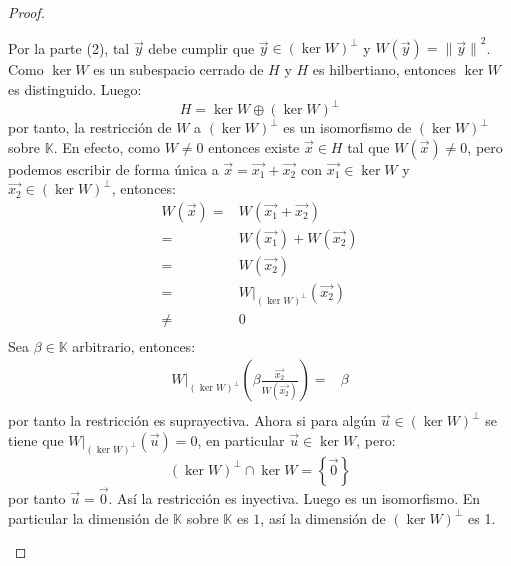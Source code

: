 \documentclass[12pt]{report}
\theoremstyle{largebreak}
\newcommand\norm[1]{\ensuremath{\|#1\|}}
\begin{document}
\begin{proof}
\begin{enumerate}
            Por la parte (2), tal $\vec{y}$ debe cumplir que $\vec{y}\in \left(\ker W\right)^\perp$ y $W(\vec{y})=\norm{\vec{y}}^2$. Como $\ker W $ es un subespacio cerrado de $H$ y $H$ es hilbertiano, entonces $\ker W$ es distinguido. Luego:
            \begin{equation*}
                H=\ker W \oplus\left(\ker W\right)^\perp
            \end{equation*}
            por tanto, la restricción de $W$ a $\left(\ker W\right)^\perp$ es un isomorfismo de $\left(\ker W\right)^\perp$ sobre $\mathbb{K}$. En efecto, como $W\neq 0$ entonces existe $\vec{x}\in H$ tal que $W(\vec{x})\neq 0$, pero podemos escribir de forma única a $\vec{x}=\vec{x_1}+\vec{x_2}$ con $\vec{x_1}\in \ker W$ y $\vec{x_2}\in \left(\ker W\right)^\perp$, entonces:
            \begin{equation*}
                \begin{split}
                    W(\vec{x})=&W(\vec{x_1}+\vec{x_2})\\
                    =&W(\vec{x_1})+W(\vec{x_2})\\
                    =&W(\vec{x_2})\\
                    =&W\big|_{\left(\ker W\right)^\perp} (\vec{x_2})\\
                    \neq&0\\
                \end{split}
            \end{equation*}
            Sea $\beta\in\mathbb{K}$ arbitrario, entonces:
            \begin{equation*}
                \begin{split}
                    W\big|_{\left(\ker W\right)^\perp}\left(\beta\frac{\vec{x_2}}{W(\vec{x_2})} \right)=&\beta\\
                \end{split}
            \end{equation*}
            por tanto la restricción es suprayectiva. Ahora si para algún $\vec{u}\in \left(\ker W\right)^\perp$ se tiene que $W\big|_{\left(\ker W\right)^\perp}\left(\vec{u} \right)=0$, en particular $\vec{u}\in\ker W$, pero:
            \begin{equation*}
                \left(\ker W\right)^\perp\cap \ker W=\left\{\vec{0} \right\}
            \end{equation*}
            por tanto $\vec{u}=\vec{0}$. Así la restricción es inyectiva. Luego es un isomorfismo. En particular la dimensión de $\mathbb{K}$ sobre $\mathbb{K}$ es $1$, así la dimensión de $\left(\ker W\right)^\perp$ es 1.


\end{enumerate}
\end{proof}
\end{document}

